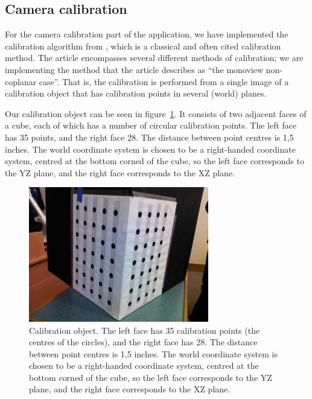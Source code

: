 
\subsection{Camera calibration}
\label{sec:calibration}

For the camera calibration part of the application, we have
implemented the calibration algorithm from \cite{TSAI}, which is a
classical and often cited calibration method. The article encompasses
several different methods of calibration; we are implementing the
method that the article describes as ``the monoview non-coplanar
case''. That is, the calibration is performed from a single image
of a calibration object that has calibration points in several (world)
planes.

Our calibration object can be seen in figure~\ref{fig:calib-object}.
It consists of two adjacent faces of a cube, each of which has a
number of circular calibration points. The left face has 35 points,
and the right face 28. The distance between point centres is 1,5
inches. The world coordinate system is chosen to be a right-handed
coordinate system, centred at the bottom corned of the cube, so the
left face corresponds to the YZ plane, and the right face corresponds
to the XZ plane.

\begin{figure}[hb]
  \centering
  \includegraphics[width=0.7\textwidth]{figures/calibration-object}
  \caption[Calibration object]{Calibration object. The left face has
    35 calibration points (the centres of the circles), and the right
    face has 28. The distance between point centres is 1,5 inches. The
    world coordinate system is chosen to be a right-handed coordinate
    system, centred at the bottom corned of the cube, so the left face
    corresponds to the YZ plane, and the right face corresponds to the
    XZ plane.}
  \label{fig:calib-object}
\end{figure}


